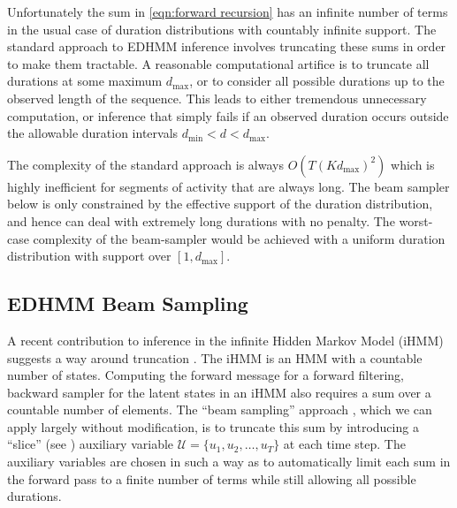 Unfortunately the sum in \eqref{eqn:forward recursion} has an infinite number of terms in the usual case of  duration distributions with countably infinite support. The standard approach to EDHMM inference involves truncating these sums in order to make them tractable. 
A reasonable computational artifice is to truncate all durations at some maximum $d_\mathrm{max}$, or to consider all possible durations up to the observed length of the sequence. This leads to either tremendous unnecessary computation, or inference that simply fails if an observed duration occurs outside the allowable duration intervals $d_\mathrm{min}<d<d_\mathrm{max}$. 

The complexity of the standard approach \cite{Yu10} is always $O(T(Kd_\mathrm{max})^2)$ which is highly inefficient for segments of activity that are always long. The beam sampler below is only constrained by the effective support of the duration distribution, and hence can deal with extremely long durations with no penalty. The worst-case complexity of the beam-sampler would be achieved with a uniform duration distribution with support over $[1, d_\mathrm{max}]$. 

\subsection{EDHMM Beam Sampling}

A recent contribution to inference 
in 
the infinite Hidden Markov Model (iHMM) \cite{Beal2002} suggests a way around truncation \cite{vanGael2008}.  The iHMM is an HMM with a countable number of states.  Computing the forward message for a forward filtering, backward sampler for the latent states in an iHMM also requires a sum over a countable number of elements.  
The ``beam sampling'' approach  \cite{vanGael2008}, which we can apply largely without modification, is to truncate this sum by introducing a ``slice''  (see \cite{Neal2003}) auxiliary variable $\mathcal{U} = \{u_1, u_2, \ldots,u_T\}$ at each time step.  The auxiliary variables are chosen in such a way as to automatically limit each sum in the forward pass to a finite number of terms while still allowing all possible durations.%

